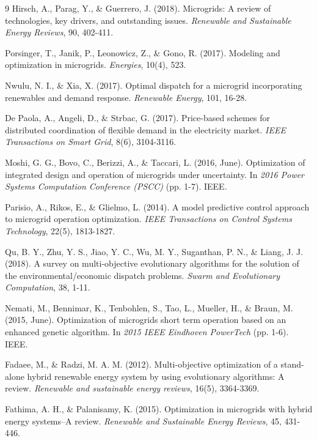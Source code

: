 \documentclass[final,3p,times]{elsarticle}
\begin{document}
\begin{thebibliography}{9}
Hirsch, A., Parag, Y., \& Guerrero, J. (2018). Microgrids: A review of technologies, key drivers, and outstanding issues. \textit{Renewable and Sustainable Energy Reviews}, 90, 402-411.

Porsinger, T., Janik, P., Leonowicz, Z., \& Gono, R. (2017). Modeling and optimization in microgrids. \textit{Energies}, 10(4), 523.

Nwulu, N. I., \& Xia, X. (2017). Optimal dispatch for a microgrid incorporating renewables and demand response. \textit{Renewable Energy}, 101, 16-28.

De Paola, A., Angeli, D., \& Strbac, G. (2017). Price-based schemes for distributed coordination of flexible demand in the electricity market. \textit{IEEE Transactions on Smart Grid}, 8(6), 3104-3116.

Moshi, G. G., Bovo, C., Berizzi, A., \& Taccari, L. (2016, June). Optimization of integrated design and operation of microgrids under uncertainty. In \textit{2016 Power Systems Computation Conference (PSCC)} (pp. 1-7). IEEE.

Parisio, A., Rikos, E., \& Glielmo, L. (2014). A model predictive control approach to microgrid operation optimization. \textit{IEEE Transactions on Control Systems Technology}, 22(5), 1813-1827.

Qu, B. Y., Zhu, Y. S., Jiao, Y. C., Wu, M. Y., Suganthan, P. N., \& Liang, J. J. (2018). A survey on multi-objective evolutionary algorithms for the solution of the environmental/economic dispatch problems. \textit{Swarm and Evolutionary Computation}, 38, 1-11.

Nemati, M., Bennimar, K., Tenbohlen, S., Tao, L., Mueller, H., \& Braun, M. (2015, June). Optimization of microgrids short term operation based on an enhanced genetic algorithm. In \textit{2015 IEEE Eindhoven PowerTech} (pp. 1-6). IEEE.

Fadaee, M., \& Radzi, M. A. M. (2012). Multi-objective optimization of a stand-alone hybrid renewable energy system by using evolutionary algorithms: A review. \textit{Renewable and sustainable energy reviews}, 16(5), 3364-3369.

Fathima, A. H., \& Palanisamy, K. (2015). Optimization in microgrids with hybrid energy systems–A review. \textit{Renewable and Sustainable Energy Reviews}, 45, 431-446.


\end{thebibliography}
\end{document}

